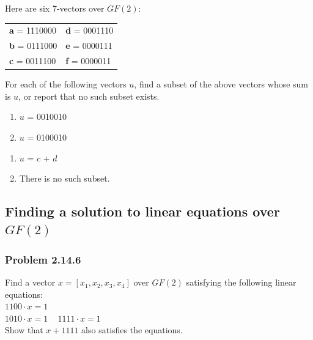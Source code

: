 \documentclass[
  letterpaper,
  DIV=11,
  numbers=noendperiod]{scrartcl}
\providecommand{\tightlist}{%
  \setlength{\itemsep}{0pt}\setlength{\parskip}{0pt}}\usepackage{longtable,booktabs,array}
\begin{document}
Here are six 7-vectors over \(GF(2)\):

\begin{longtable}[]{@{}ll@{}}
\toprule()
\endhead
\textbf{a} = 1110000 & \textbf{d} = 0001110 \\
\textbf{b} = 0111000 & \textbf{e} = 0000111 \\
\textbf{c} = 0011100 & \textbf{f} = 0000011 \\
\bottomrule()
\end{longtable}

For each of the following vectors \(u\), find a subset of the above
vectors whose sum is \(u\), or report that no such subset exists.

\begin{enumerate}
\def\labelenumi{\arabic{enumi}.}
\tightlist
\item
  \(u\) = 0010010\\
\item
  \(u\) = 0100010 ~
\end{enumerate}

\begin{enumerate}
\def\labelenumi{\arabic{enumi})}
\tightlist
\item
  \(u\) = \(c\) + \(d\)\\
\item
  There is no such subset.
\end{enumerate}

\hypertarget{finding-a-solution-to-linear-equations-over-gf2}{%
\subsection{\texorpdfstring{Finding a solution to linear equations over
\(GF(2)\)}{Finding a solution to linear equations over GF(2)}}\label{finding-a-solution-to-linear-equations-over-gf2}}

\hypertarget{problem-2.14.6}{%
\subsubsection{Problem 2.14.6}\label{problem-2.14.6}}

Find a vector \(x = [x_1, x_2, x_3, x_4]\) over \(GF(2)\) satisfying the
following linear equations:\\
\(1100 \cdot x = 1\)\\
\(1010 \cdot x = 1\) ~ \(1111 \cdot x = 1\)\\
Show that \(x + 1111\) also satisfies the equations.\\
\end{document}

